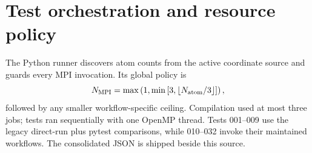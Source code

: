 \documentclass[aps,prb,preprint,superscriptaddress,longbibliography,floatfix]{revtex4-2}
\begin{document}
\section{Test orchestration and resource policy}
The Python runner discovers atom counts from the active coordinate source and guards every MPI invocation. Its global policy is
\begin{equation}
N_{\rm MPI}=\max\left(1,\min\left[3,\left\lfloor N_{\rm atom}/3\right\rfloor\right]\right),
\end{equation}
followed by any smaller workflow-specific ceiling. Compilation used at most three jobs; tests ran sequentially with one OpenMP thread. Tests 001--009 use the legacy direct-run plus pytest comparisons, while 010--032 invoke their maintained workflows. The consolidated JSON is shipped beside this source.
\end{document}
